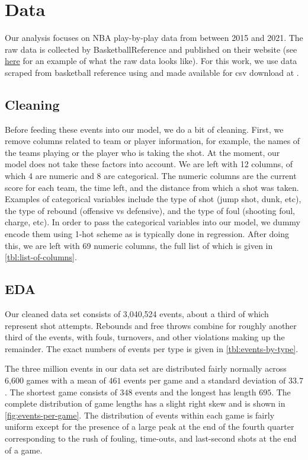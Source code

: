 \section{Data}

Our analysis focuses on NBA play-by-play data from between 2015 and 2021. The raw data is collected by BasketballReference and published on their website \cite{bbref} (see \href{https://www.basketball-reference.com/boxscores/pbp/202101200TOR.html#q1}{here} for an example of what the raw data looks like). For this work, we use data scraped from basketball reference using \cite{pbp-scraper-github} and made available for csv download at \cite{kaggle-pbp-data}.

\subsection{Cleaning}

Before feeding these events into our model, we do a bit of cleaning. First, we remove columns related to team or player information, for example, the names of the teams playing or the player who is taking the shot. At the moment, our model does not take these factors into account.
We are left with 12 columns, of which 4 are numeric and 8 are categorical.
The numeric columns are the current score for each team, the time left, and the distance from which a shot was taken.
Examples of categorical variables include the type of shot (jump shot, dunk, etc), the type of rebound (offensive vs defensive), and the type of foul (shooting foul, charge, etc).
In order to pass the categorical variables into our model, we dummy encode them using 1-hot scheme as is typically done in regression. After doing this, we are left with 69 numeric columns, the full list of which is given in \autoref{tbl:list-of-columns}.

\subsection{EDA}

Our cleaned data set consists of 3,040,524 events, about a third of which represent shot attempts. Rebounds and free throws combine for roughly another third of the events, with fouls, turnovers, and other violations making up the remainder. The exact numbers of events per type is given in \autoref{tbl:events-by-type}.

The three million events in our data set are distributed fairly normally across 6,600 games with a mean of $461$ events per game and a standard deviation of $33.7$. The shortest game consists of $348$ events and the longest has length $695$. The complete distribution of game lengths has a slight right skew and is shown in \autoref{fig:events-per-game}. The distribution of events within each game is fairly uniform except for the presence of a large peak at the end of the fourth quarter corresponding to the rush of fouling, time-outs, and last-second shots at the end of a game.

